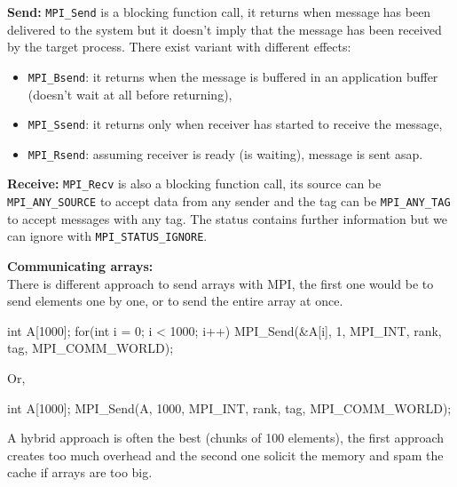     \begin{tcolorbox}[violet]
        
        \textbf{Send:} \lstinline!MPI_Send! is a blocking function call, it returns when message has been delivered to the system but it doesn't imply that the message has been received by the target process. There exist variant with different effects:
        \begin{itemize}[left=10pt]
            \item \lstinline!MPI_Bsend!: it returns when the message is buffered in an application buffer (doesn't wait at all before returning), 
            \item \lstinline!MPI_Ssend!: it returns only when receiver has started to receive the message,
            \item \lstinline!MPI_Rsend!: assuming receiver is ready (is waiting), message is sent asap.
        \end{itemize}
    \end{tcolorbox}
    \begin{tcolorbox}[violet]
        \textbf{Receive:} \lstinline!MPI_Recv! is also a blocking function call, its source can be \lstinline!MPI_ANY_SOURCE! to accept data from any sender and the tag can be \lstinline!MPI_ANY_TAG! to accept messages with any tag. The status contains further information but we can ignore with \lstinline!MPI_STATUS_IGNORE!.
    \end{tcolorbox}
    \textbf{Communicating arrays:}\\
    There is different approach to send arrays with MPI, the first one would be to send elements one by one, or to send the entire array at once.
    \begin{codeCenter}
    \begin{Ccode}
int A[1000];
for(int i = 0; i < 1000; i++) {
    MPI_Send(&A[i], 1, MPI_INT, rank, tag, MPI_COMM_WORLD);
}
    \end{Ccode}
    \end{codeCenter}
    Or, 
    \begin{codeCenter}
    \begin{Ccode}
int A[1000];
MPI_Send(A, 1000, MPI_INT, rank, tag, MPI_COMM_WORLD);
    \end{Ccode}
    \end{codeCenter}
    A hybrid approach is often the best (chunks of 100 elements), the first approach creates too much overhead and the second one solicit the memory and spam the cache if arrays are too big.
    
